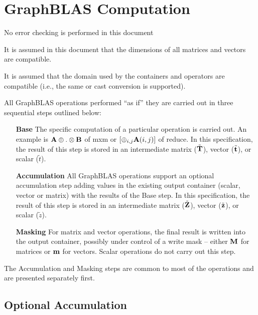 \section{GraphBLAS Computation }

No error checking is performed in this document

It is assumed in this document that the dimensions of all matrices and vectors are compatible.

It is assumed that the domain used by the containers and operators are compatible (i.e., the same or cast conversion is supported).  

All GraphBLAS operations performed ``as if'' they are carried out in three sequential steps outlined below:

\begin{enumerate}[leftmargin=1.1in]
\item[\bf Base] The specific computation of a particular operation is carried out.  An example is ${\bf A}\oplus.\otimes{\bf B}$ of {\sf mxm} or $\left[\oplus_{i,j}{\bf A}(i,j) \right]$ of {\sf reduce}.  In this specification, the result of this step is stored in an intermediate matrix ($\tilde{{\bf T}}$), vector ($\tilde{{\bf t}}$), or scalar ($\tilde{t}$).

\item[\bf Accumulation] All GraphBLAS operations support an optional accumulation step  adding values in the existing output container (scalar, vector or matrix) with the results of the Base step.  In this specification, the result of this step is stored in an intermediate matrix ($\tilde{{\bf Z}}$), vector ($\tilde{{\bf z}}$), or scalar ($\tilde{z}$).

\item[\bf Masking] For matrix and vector operations, the final result is written into the output container, possibly under control of a write mask -- either ${\bf M}$ for matrices or ${\bf m}$ for vectors.  Scalar operations do not carry out this step.

\end{enumerate}

The Accumulation and Masking steps are common to most of the operations and are presented separately first.

\subsection{Optional Accumulation}

